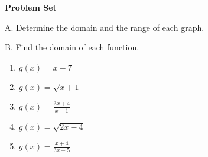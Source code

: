 \def\figdir{/storage/emulated/0/Documents/documents/latex/1920/Grade-8/2nd/domain-and-range-of-a-function/f}

\textbf{Problem Set}

\vspce

A. Determine the domain and the range of each graph.
\begin{enumerate}[label = \arabic*. ]
\begin{multicols}{2}
\item  
\item  
\item  
\item  
\item  
\item  
\end{multicols} 
\end{enumerate}  

B. Find the domain of each function.
\begin{enumerate}[label = \arabic*. ]
\item \hspce ${g(x)  = x-7 }$ 
\vspce 
\item \hspce ${g(x)  =  \sqrt{x+1} }$ 
\vspce 
\item \hspce ${ g(x) = \displaystyle  \frac{3x+4}{x-1} }$ 
\vspce 
\item \hspce ${ g(x)  =  \sqrt{ 2x-4} }$ 
\vspce 
\item \hspce ${g(x)  = \displaystyle  \frac{x+4}{3x-5} }$ 
\end{enumerate}  
